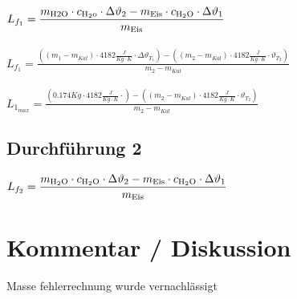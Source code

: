 \documentclass[a4paper,12pt]{article}
\begin{document}
$L_{f_1}= \displaystyle{\frac{m_{\rm{H2O}} \cdot c_{\rm{H_2o}} \cdot \Delta\vartheta_2 - m_{\rm{Eis}} \cdot c_{\rm{H_2O}} \cdot \Delta\vartheta_1}{m_{\rm{Eis}}}}$\\\\

$L_{f_1}=\displaystyle{\frac{\left(\left(m_1-m_{Kal}\right) \cdot 4182\frac{J}{Kg \cdot K}\cdot \Delta \vartheta_{T_1}\right)-\left(\left(m_2-m_{Kal}\right)\cdot 4182 \frac{J}{Kg \cdot K} \cdot \vartheta_{T_2}\right)}{m_2-m_{Kal}}} $\\\\

$L_{1_{max}} =\displaystyle{\frac{\left(0.174Kg \cdot 4182\frac{J}{Kg \cdot K}\cdot \right)-\left(\left(m_2-m_{Kal}\right)\cdot 4182 \frac{J}{Kg \cdot K} \cdot \vartheta_{T_2}\right)}{m_2-m_{Kal}}} $

\subsection{Durchführung 2}
$L_{f_2} = \displaystyle{\frac{m_{\rm{H_{2}O}} \cdot c_{\rm{H_{2}O}} \cdot \Delta\vartheta_2 - m_{\rm{Eis}} \cdot c_{\rm{H_2O}} \cdot \Delta\vartheta_1}{m_{\rm{Eis}}}}$
\section{Kommentar / Diskussion}

Masse fehlerrechnung wurde vernachlässigt
\end{document}
